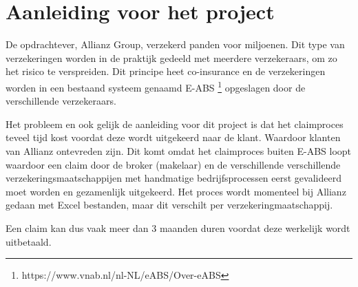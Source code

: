 \chapter{Aanleiding voor het project}
De opdrachtever, Allianz Group, verzekerd panden voor miljoenen. Dit type van verzekeringen worden in de praktijk gedeeld met meerdere verzekeraars, om zo het risico te verspreiden. Dit principe heet co-insurance en de verzekeringen worden in een bestaand systeem genaamd E-ABS \footnote{https://www.vnab.nl/nl-NL/eABS/Over-eABS} opgeslagen door de verschillende verzekeraars.\par

Het probleem en ook gelijk de aanleiding voor dit project is dat het claimproces teveel tijd kost voordat deze wordt uitgekeerd naar de klant. Waardoor klanten van Allianz ontevreden zijn. Dit komt omdat het claimproces buiten E-ABS loopt waardoor een claim door de broker (makelaar) en de verschillende verschillende verzekeringsmaatschappijen met handmatige bedrijfsprocessen eerst gevalideerd moet worden en gezamenlijk uitgekeerd. Het proces wordt momenteel bij Allianz gedaan met Excel bestanden, maar dit verschilt per verzekeringmaatschappij.\par

 Een claim kan dus vaak meer dan 3 maanden duren voordat deze werkelijk wordt uitbetaald.